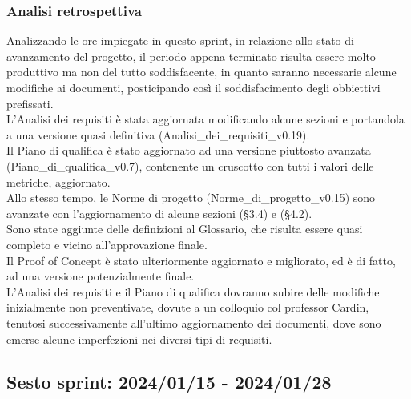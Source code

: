 \newpage
\subsubsection{Analisi retrospettiva}
Analizzando le ore impiegate in questo sprint, in relazione allo stato di avanzamento del progetto, il periodo appena terminato risulta essere molto produttivo ma non del tutto soddisfacente, in quanto saranno necessarie alcune modifiche ai documenti, posticipando così il soddisfacimento degli obbiettivi prefissati.\\
L'Analisi dei requisiti è stata aggiornata modificando alcune sezioni e portandola a una versione quasi definitiva (Analisi\_dei\_requisiti\_v0.19).\\
Il Piano di qualifica è stato aggiornato ad una versione piuttosto avanzata (Piano\_di\_qualifica\_v0.7), contenente un cruscotto con tutti i valori delle metriche, aggiornato.\\
Allo stesso tempo, le Norme di progetto (Norme\_di\_progetto\_v0.15) sono avanzate con l'aggiornamento di alcune sezioni (§3.4) e (§4.2).\\
Sono state aggiunte delle definizioni al Glossario, che risulta essere quasi completo e vicino all'approvazione finale.\\
Il Proof of Concept è stato ulteriormente aggiornato e migliorato, ed è di fatto, ad una versione potenzialmente finale.\\
L'Analisi dei requisiti e il Piano di qualifica dovranno subire delle modifiche inizialmente non preventivate, dovute a un colloquio col professor Cardin, tenutosi successivamente all'ultimo aggiornamento dei documenti, dove sono emerse alcune imperfezioni nei diversi tipi di requisiti.\\

\newpage

\subsection{Sesto sprint: 2024/01/15 - 2024/01/28}

